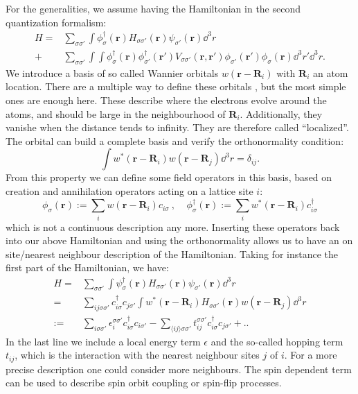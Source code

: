 \documentclass[../main.tex]{subfile}
\begin{document}
For the generalities, we assume having the Hamiltonian in the second quantization formalism:
\begin{align*}
    H = & \sum_{\sigma\sigma'} \int \phi_{\sigma}^{\dagger}(\bm{r}) H_{\sigma\sigma'}(\bm{r}) \psi_{\sigma'}(\bm{r}) \dd^3r\\
    + & \sum_{\sigma\sigma'} \int \int \phi_{\sigma}^{\dagger}(\bm{r})\phi_{\sigma'}^{\dagger}(\bm{r}') V_{\sigma\sigma'}(\bm{r},\bm{r}')
     \phi_{\sigma'}(\bm{r}')\phi_{\sigma}(\bm{r}) \dd^3r'\dd^3r.
\end{align*}
We introduce a basis of so called Wannier orbitals $w(\bm{r} - \bm{R}_i)$ with $\bm{R}_i$ an atom location. There are a multiple way to define these orbitals \cite{Marzari},
but the most simple ones \cite{Wannier1937} are enough here. These describe where the electrons evolve around the atoms, and should be large
in the neighbourhood of $\bm{R}_i$. Additionally, they vanishe when the distance tends to infinity.
They are therefore called ``localized''. The orbital can build a complete basis and verify the orthonormality condition:
\[
    \int w^{\ast}(\bm{r} - \bm{R}_i) w(\bm{r} - \bm{R}_j) \dd^3r = \delta_{ij}.
\]
From this property we can define some field operators in this basis, based on creation and annihilation operators acting on a lattice site $i$:
\begin{equation}\label{eq:Wannier_fieldOp}
    \phi_{\sigma}(\bm{r}) := \sum_{i} w(\bm{r} - \bm{R}_i) c_{i\sigma} ~,~~~~~ \phi_{\sigma}^{\dagger}(\bm{r}) := \sum_{i} w^{\ast}(\bm{r} - \bm{R}_i) c_{i\sigma}^{\dagger}
\end{equation}
which is not a continuous description any more. 
Inserting these operators back into our above Hamiltonian and using the orthonormality allows us to have an on site/nearest neighbour description of the Hamiltonian. Taking for
instance the first part of the Hamiltonian, we have:
\begin{align*}
    H = & \sum_{\sigma\sigma'} \int \psi_{\sigma}^{\dagger}(\bm{r}) H_{\sigma\sigma'}(\bm{r}) \psi_{\sigma'}(\bm{r}) \dd^3r\\
    =& \sum_{ij\sigma\sigma'} c_{i\sigma}^{\dagger} c_{j\sigma'}\int w^{\ast}(\bm{r} - \bm{R}_i) H_{\sigma\sigma'}(\bm{r}) w(\bm{r} - \bm{R}_j) \dd^3r\\
    := & \sum_{i\sigma\sigma'} \epsilon_i^{\sigma\sigma'} c_{i\sigma}^{\dagger} c_{i\sigma'} - \sum_{\langle ij\rangle\sigma\sigma'} t_{ij}^{\sigma\sigma'} c_{i\sigma}^{\dagger} c_{j\sigma'} + ..   
\end{align*}
In the last line we include a local energy term $\epsilon$ and the so-called hopping term $t_{ij}$, which is the interaction with the nearest neighbour sites $j$ of $i$.
For a more precise description one could consider more neighbours. The spin dependent term can be used to describe spin orbit coupling or spin-flip processes.\\
\end{document}
